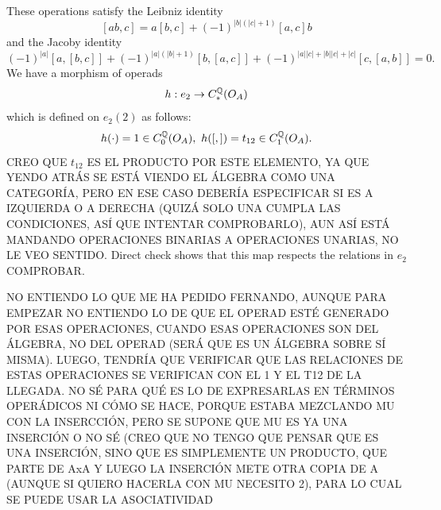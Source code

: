 \documentclass[TFM.tex]{subfiles}
\begin{document}
These operations satisfy the Leibniz identity
\[
[ab, c]= a[b, c]+(-1)^{|b|(|c|+1)}[a,c]b
\]
and the Jacoby identity
\[
(-1)^{|a|}[a,[b,c]]+(-1)^{|a|(|b|+1)}[b,[a,c]]+(-1)^{|a||c|+|b||c|+|c|}[c,[a,b]]=0.
\]
We have a morphism of operads
\[
h:e_2\to C_*^{\mathbb{Q}}(O_A)
\]
which is defined on $e_2(2)$ as follows:
\[
h(\cdot)=1\in C_0^\Q(O_A),\ h([,])=t_{12}\in C_1^\Q(O_A).
\]
CREO QUE $t_{12}$ ES EL PRODUCTO POR ESTE ELEMENTO, YA QUE YENDO ATRÁS SE ESTÁ VIENDO EL ÁLGEBRA COMO UNA CATEGORÍA, PERO EN ESE CASO DEBERÍA ESPECIFICAR SI ES A IZQUIERDA O A DERECHA (QUIZÁ SOLO UNA CUMPLA LAS CONDICIONES, ASÍ QUE INTENTAR COMPROBARLO), AUN ASÍ ESTÁ MANDANDO OPERACIONES BINARIAS A OPERACIONES UNARIAS, NO LE VEO SENTIDO. Direct check shows that this map respects the relations in $e_2$ COMPROBAR.

NO ENTIENDO LO QUE ME HA PEDIDO FERNANDO, AUNQUE PARA EMPEZAR NO ENTIENDO LO DE QUE EL OPERAD ESTÉ GENERADO POR ESAS OPERACIONES, CUANDO ESAS OPERACIONES SON DEL ÁLGEBRA, NO DEL OPERAD (SERÁ QUE ES UN ÁLGEBRA SOBRE SÍ MISMA). LUEGO, TENDRÍA QUE VERIFICAR QUE LAS RELACIONES DE ESTAS OPERACIONES SE VERIFICAN CON EL 1 Y EL T12 DE LA LLEGADA. NO SÉ PARA QUÉ ES LO DE EXPRESARLAS EN TÉRMINOS OPERÁDICOS NI CÓMO SE HACE, PORQUE ESTABA MEZCLANDO MU CON LA INSERCCIÓN, PERO SE SUPONE QUE MU ES YA UNA INSERCIÓN O NO SÉ (CREO QUE NO TENGO QUE PENSAR QUE ES UNA INSERCIÓN, SINO QUE ES SIMPLEMENTE UN PRODUCTO, QUE PARTE DE AxA Y LUEGO LA INSERCIÓN METE OTRA COPIA DE A (AUNQUE SI QUIERO HACERLA CON MU NECESITO 2), PARA LO CUAL SE PUEDE USAR LA ASOCIATIVIDAD
\end{document}
